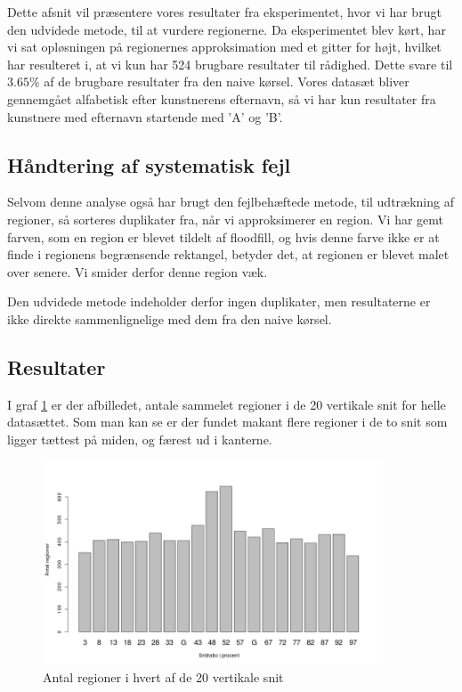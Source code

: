 {
{\sffamily Dette afsnit vil præsentere vores resultater fra
eksperimentet, hvor vi har brugt den udvidede metode, til at vurdere
regionerne. Da eksperimentet blev kørt, har vi sat opløsningen på
regionernes approksimation med et gitter for højt, hvilket har
resulteret i, at vi kun har 524 brugbare resultater til rådighed. Dette
svare til $\mathsf{3.65\%}$ af de brugbare resultater fra den naive
kørsel. Vores datasæt bliver gennemgået alfabetisk efter kunstnerens
efternavn, så vi har kun resultater fra kunstnere med efternavn
startende med 'A' og 'B'.
}

\subsection{Håndtering af systematisk fejl}
Selvom denne analyse også har brugt den fejlbehæftede metode, til
udtrækning af regioner, så sorteres duplikater fra, når vi approksimerer
en region. Vi har gemt farven, som en region er blevet tildelt af
floodfill, og hvis denne farve ikke er at finde i regionens begrænsende
rektangel, betyder det, at regionen er blevet malet over senere. Vi
smider derfor denne region væk.

Den udvidede metode indeholder derfor ingen duplikater, men resultaterne
er ikke direkte sammenlignelige med dem fra den naive kørsel.

\subsection{Resultater}
I graf \ref{antal_regioner_vertikale_cut_udvidet} er der afbilledet,
antale sammelet regioner i de 20 vertikale snit for helle datasættet.
Som man kan se er der fundet makant flere regioner i de to snit som
ligger tættest på miden, og færest ud i kanterne. 

\begin{figure}[h!]
	\begin{center}
		\includegraphics[width=0.9\textwidth]{afsnit/resultater/billeder/cut0cut1eatsperratioU.png}
	\end{center}
	\caption{Antal regioner i hvert af de 20 vertikale snit}
	\label{antal_regioner_vertikale_cut_udvidet}
\end{figure}

}
